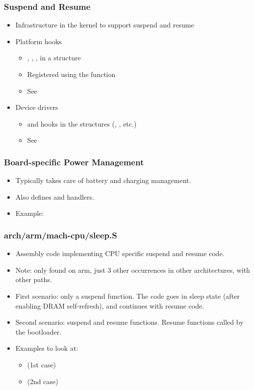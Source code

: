 \begin{frame}
  \frametitle{Suspend and Resume}
  \begin{itemize}
  \item Infrastructure in the kernel to support suspend and resume
  \item Platform hooks
    \begin{itemize}
    \item {}, , ,
       in a  structure
    \item Registered using the  function
    \item See 
    \end{itemize}
  \item Device drivers
    \begin{itemize}
    \item {} and  hooks in the
       structures (,
      , etc.)
    \item See 
    \end{itemize}
  \end{itemize}
\end{frame}

\begin{frame}
  \frametitle{Board-specific Power Management}
  \begin{itemize}
  \item Typically takes care of battery and charging management.
  \item Also defines  and 
    handlers.
  \item Example: 
  \end{itemize}
\end{frame}

\begin{frame}
  \frametitle{arch/arm/mach-cpu/sleep.S}
  \begin{itemize}
  \item Assembly code implementing CPU specific suspend and resume
    code.
  \item Note: only found on arm, just 3 other occurrences in other
    architectures, with other paths.
  \item First scenario: only a suspend function. The code goes in
    sleep state (after enabling DRAM self-refresh), and continues with
    resume code.
  \item Second scenario: suspend and resume functions. Resume
    functions called by the bootloader.
  \item Examples to look at:
    \begin{itemize}
    \item {} (1st case)
    \item {} (2nd case)
    \end{itemize}
  \end{itemize}
\end{frame}


